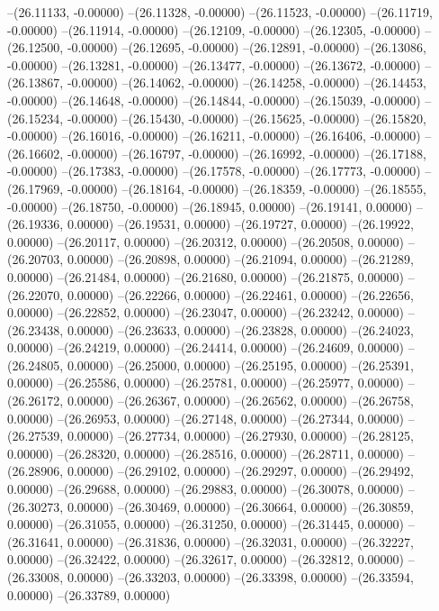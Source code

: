 --(26.11133, -0.00000)
--(26.11328, -0.00000)
--(26.11523, -0.00000)
--(26.11719, -0.00000)
--(26.11914, -0.00000)
--(26.12109, -0.00000)
--(26.12305, -0.00000)
--(26.12500, -0.00000)
--(26.12695, -0.00000)
--(26.12891, -0.00000)
--(26.13086, -0.00000)
--(26.13281, -0.00000)
--(26.13477, -0.00000)
--(26.13672, -0.00000)
--(26.13867, -0.00000)
--(26.14062, -0.00000)
--(26.14258, -0.00000)
--(26.14453, -0.00000)
--(26.14648, -0.00000)
--(26.14844, -0.00000)
--(26.15039, -0.00000)
--(26.15234, -0.00000)
--(26.15430, -0.00000)
--(26.15625, -0.00000)
--(26.15820, -0.00000)
--(26.16016, -0.00000)
--(26.16211, -0.00000)
--(26.16406, -0.00000)
--(26.16602, -0.00000)
--(26.16797, -0.00000)
--(26.16992, -0.00000)
--(26.17188, -0.00000)
--(26.17383, -0.00000)
--(26.17578, -0.00000)
--(26.17773, -0.00000)
--(26.17969, -0.00000)
--(26.18164, -0.00000)
--(26.18359, -0.00000)
--(26.18555, -0.00000)
--(26.18750, -0.00000)
--(26.18945, 0.00000)
--(26.19141, 0.00000)
--(26.19336, 0.00000)
--(26.19531, 0.00000)
--(26.19727, 0.00000)
--(26.19922, 0.00000)
--(26.20117, 0.00000)
--(26.20312, 0.00000)
--(26.20508, 0.00000)
--(26.20703, 0.00000)
--(26.20898, 0.00000)
--(26.21094, 0.00000)
--(26.21289, 0.00000)
--(26.21484, 0.00000)
--(26.21680, 0.00000)
--(26.21875, 0.00000)
--(26.22070, 0.00000)
--(26.22266, 0.00000)
--(26.22461, 0.00000)
--(26.22656, 0.00000)
--(26.22852, 0.00000)
--(26.23047, 0.00000)
--(26.23242, 0.00000)
--(26.23438, 0.00000)
--(26.23633, 0.00000)
--(26.23828, 0.00000)
--(26.24023, 0.00000)
--(26.24219, 0.00000)
--(26.24414, 0.00000)
--(26.24609, 0.00000)
--(26.24805, 0.00000)
--(26.25000, 0.00000)
--(26.25195, 0.00000)
--(26.25391, 0.00000)
--(26.25586, 0.00000)
--(26.25781, 0.00000)
--(26.25977, 0.00000)
--(26.26172, 0.00000)
--(26.26367, 0.00000)
--(26.26562, 0.00000)
--(26.26758, 0.00000)
--(26.26953, 0.00000)
--(26.27148, 0.00000)
--(26.27344, 0.00000)
--(26.27539, 0.00000)
--(26.27734, 0.00000)
--(26.27930, 0.00000)
--(26.28125, 0.00000)
--(26.28320, 0.00000)
--(26.28516, 0.00000)
--(26.28711, 0.00000)
--(26.28906, 0.00000)
--(26.29102, 0.00000)
--(26.29297, 0.00000)
--(26.29492, 0.00000)
--(26.29688, 0.00000)
--(26.29883, 0.00000)
--(26.30078, 0.00000)
--(26.30273, 0.00000)
--(26.30469, 0.00000)
--(26.30664, 0.00000)
--(26.30859, 0.00000)
--(26.31055, 0.00000)
--(26.31250, 0.00000)
--(26.31445, 0.00000)
--(26.31641, 0.00000)
--(26.31836, 0.00000)
--(26.32031, 0.00000)
--(26.32227, 0.00000)
--(26.32422, 0.00000)
--(26.32617, 0.00000)
--(26.32812, 0.00000)
--(26.33008, 0.00000)
--(26.33203, 0.00000)
--(26.33398, 0.00000)
--(26.33594, 0.00000)
--(26.33789, 0.00000)
